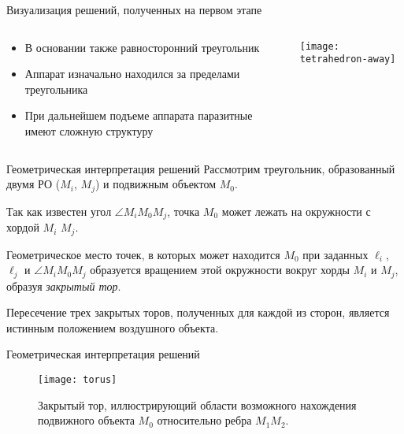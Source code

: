 \documentclass[russian,hyperref={unicode}]{beamer}
\begin{document}
  \begin{frame}{Визуализация решений, полученных на первом этапе}
    \begin{columns}[c]
      \begin{column}{.5\textwidth}
        \begin{itemize}
          \item В основании также равносторонний треугольник
          \item Аппарат изначально находился за пределами треугольника
          \item При дальнейшем подъеме аппарата паразитные имеют
                сложную структуру
        \end{itemize}
      \end{column}
      \begin{column}{.5\textwidth}
        \begin{center}
          \texttt{[image: tetrahedron-away]}
        \end{center}
      \end{column}
    \end{columns}
  \end{frame}

  \begin{frame}{Геометрическая интерпретация решений}
    Рассмотрим треугольник, образованный двумя РО ($M_i$, $M_j$) и подвижным объектом $M_0$.

    Так как известен угол $\angle M_i M_0 M_j$, точка $M_0$ может лежать на окружности с хордой $M_i$ $M_j$.

    Геометрическое место точек, в которых может находится $M_0$ при заданных $\ell_{i}$, $\ell_{j}$ и
    $\angle M_i M_0 M_j$ образуется вращением этой окружности вокруг хорды $M_i$ и $M_j$, образуя \textit{закрытый тор}.

    Пересечение трех закрытых торов, полученных для каждой из сторон, является истинным положением
    воздушного объекта.
  \end{frame}

  \begin{frame}{Геометрическая интерпретация решений}
    \begin{center}
      \begin{figure}
        \texttt{[image: torus]}
        \caption{Закрытый тор, иллюстрирующий области возможного нахождения подвижного объекта $M_0$
        относительно ребра $M_1M_2$.}
      \end{figure}
    \end{center}
  \end{frame}
\end{document}
